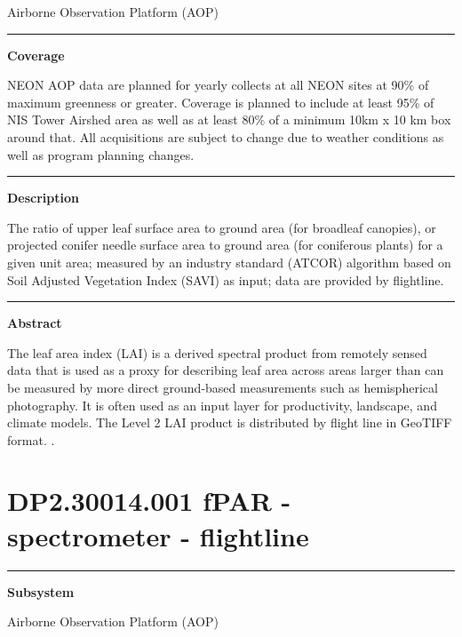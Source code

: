 \documentclass[]{article}
\begin{document}
Airborne Observation Platform (AOP)

\begin{center}\rule{0.5\linewidth}{\linethickness}\end{center}

\textbf{Coverage}

NEON AOP data are planned for yearly collects at all NEON sites at 90\%
of maximum greenness or greater. Coverage is planned to include at least
95\% of NIS Tower Airshed area as well as at least 80\% of a minimum
10km x 10 km box around that. All acquisitions are subject to change due
to weather conditions as well as program planning changes.

\begin{center}\rule{0.5\linewidth}{\linethickness}\end{center}

\textbf{Description}

The ratio of upper leaf surface area to ground area (for broadleaf
canopies), or projected conifer needle surface area to ground area (for
coniferous plants) for a given unit area; measured by an industry
standard (ATCOR) algorithm based on Soil Adjusted Vegetation Index
(SAVI) as input; data are provided by flightline.

\begin{center}\rule{0.5\linewidth}{\linethickness}\end{center}

\textbf{Abstract}

The leaf area index (LAI) is a derived spectral product from remotely
sensed data that is used as a proxy for describing leaf area across
areas larger than can be measured by more direct ground-based
measurements such as hemispherical photography. It is often used as an
input layer for productivity, landscape, and climate models. The Level 2
LAI product is distributed by flight line in GeoTIFF format. \newpage
.

\section{DP2.30014.001 fPAR - spectrometer -
flightline}\label{dp2.30014.001-fpar---spectrometer---flightline}

\begin{center}\rule{0.5\linewidth}{\linethickness}\end{center}

\textbf{Subsystem}

Airborne Observation Platform (AOP)
\end{document}
